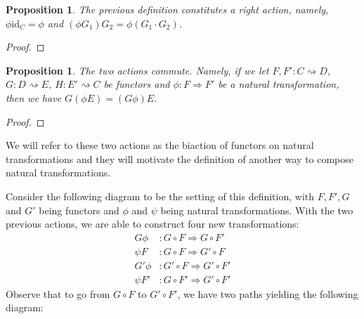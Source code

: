 \documentclass{scrartcl}
\newtheorem{prop}[thm]{Proposition}
\theoremstyle{definition}
\theoremstyle{remark}
\newcommand{\id}{\text{id}}
\begin{document}
\begin{prop}
    The previous definition constitutes a right action, namely, $\phi\id_C = \phi$ and $(\phi G_1)G_2 = \phi (G_1 \cdot G_2)$.
\end{prop}
\begin{proof}
    
\end{proof}
\begin{prop}
    The two actions commute. Namely, if we let $F,F':C\rightsquigarrow D$, $G: D\rightsquigarrow E$, $H: E'\rightsquigarrow C$ be functors and $\phi:F \Rightarrow F'$ be a natural transformation, then we have $G(\phi E) = (G\phi) E$.
\end{prop}
\begin{proof}

\end{proof}
We will refer to these two actions as the biaction of functors on natural transformations and they will motivate the definition of another way to compose natural transformations. 
\begin{figure}[h]
    \centering
\end{figure}
Consider the following diagram to be the setting of this definition, with $F,F',G$ and $G'$ being functors and $\phi$ and $\psi$ being natural transformations. With the two previous actions, we are able to construct four new transformations: 
\begin{align*}
    G\phi&: G\circ F \Rightarrow G\circ F'\\
    \psi F&: G\circ F \Rightarrow G'\circ F\\
    G'\phi&: G'\circ F \Rightarrow G'\circ F'\\
    \psi F'&: G\circ F' \Rightarrow G'\circ F'
\end{align*}
Observe that to go from $G \circ F$ to $G' \circ F'$, we have two paths yielding the following diagram:
\begin{figure}[h]
    \centering
\end{figure}
\end{document}
